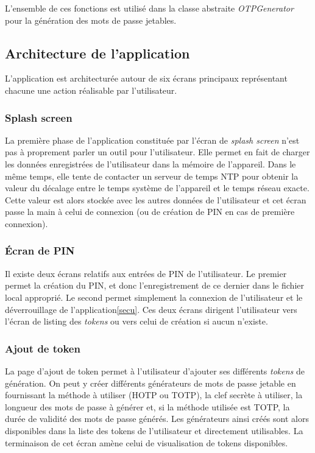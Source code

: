 L'ensemble de ces fonctions est utilisé dans la classe abstraite \emph{OTPGenerator} pour la
génération des mots de passe jetables.

\subsection{Architecture de l'application}

L'application est architecturée autour de six écrans principaux représentant chacune une
action réalisable par l'utilisateur.

\subsubsection{Splash screen}
La première phase de l'application constituée par l'écran de \emph{splash screen} n'est pas à
proprement parler un outil pour l'utilisateur. Elle permet en fait de charger les données enregistrées
de l'utilisateur dans la mémoire de l'appareil. Dans le même temps, elle tente de contacter un serveur
de temps NTP pour obtenir la valeur du décalage entre le temps système de l'appareil et le temps réseau
exacte. Cette valeur est alors stockée avec les autres données de l'utilisateur et cet écran passe la
main à celui de connexion (ou de création de PIN en cas de première connexion).

\subsubsection{Écran de PIN}
Il existe deux écrans relatifs aux entrées de PIN de l'utilisateur. Le premier permet la création
du PIN, et donc l'enregistrement de ce dernier dans le fichier local approprié. Le second permet
simplement la connexion de l'utilisateur et le déverrouillage de l'application\ref{secu}. Ces deux
écrans dirigent l'utilisateur vers l'écran de listing des \emph{tokens} ou vers celui de création
si aucun n'existe.

\subsubsection{Ajout de token}
La page d'ajout de token permet à l'utilisateur d'ajouter ses différents \emph{tokens} de
génération. On peut y créer différents générateurs de mots de passe jetable en fournissant la
méthode à utiliser (HOTP ou TOTP), la clef secrète à utiliser, la longueur des mots de passe à
générer et, si la méthode utilisée est TOTP, la durée de validité des mots de passe générés. Les
générateurs ainsi créés sont alors disponibles dans la liste des tokens de l'utilisateur et
directement utilisables. La terminaison de cet écran amène celui de visualisation de tokens
disponibles.

